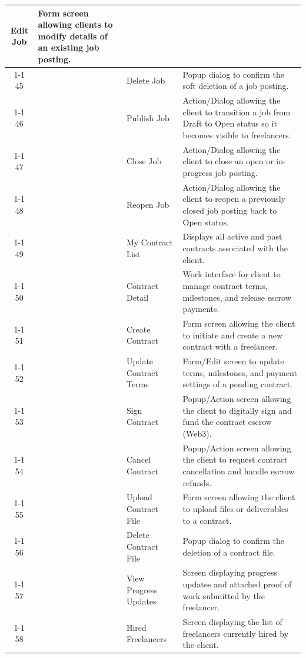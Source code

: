 \begin{longtable}{|c|>{\centering\arraybackslash}m{2.5cm}|p{3.5cm}|p{6cm}|}
Edit Job &
Form screen allowing clients to modify details of an existing job posting.
\\ \cline{1-1}\cline{3-4}
45 &
&
Delete Job &
Popup dialog to confirm the soft deletion of a job posting.
\\ \cline{1-1}\cline{3-4}
46 &
&
Publish Job &
Action/Dialog allowing the client to transition a job from Draft to Open status so it becomes visible to freelancers.
\\ \cline{1-1}\cline{3-4}
47 &
&
Close Job &
Action/Dialog allowing the client to close an open or in-progress job posting.
\\ \cline{1-1}\cline{3-4}
48 &
&
Reopen Job &
Action/Dialog allowing the client to reopen a previously closed job posting back to Open status.
\\ \cline{1-1}\cline{3-4}
49 &
&
My Contract List &
Displays all active and past contracts associated with the client.
\\ \cline{1-1}\cline{3-4}
50 &
&
Contract Detail &
Work interface for client to manage contract terms, milestones, and release escrow payments.
\\ \cline{1-1}\cline{3-4}
51 &
&
Create Contract &
Form screen allowing the client to initiate and create a new contract with a freelancer.
\\ \cline{1-1}\cline{3-4}
52 &
&
Update Contract Terms &
Form/Edit screen to update terms, milestones, and payment settings of a pending contract.
\\ \cline{1-1}\cline{3-4}
53 &
&
Sign Contract &
Popup/Action screen allowing the client to digitally sign and fund the contract escrow (Web3).
\\ \cline{1-1}\cline{3-4}
54 &
&
Cancel Contract &
Popup/Action screen allowing the client to request contract cancellation and handle escrow refunds.
\\ \cline{1-1}\cline{3-4}
55 &
&
Upload Contract File &
Form screen allowing the client to upload files or deliverables to a contract.
\\ \cline{1-1}\cline{3-4}
56 &
&
Delete Contract File &
Popup dialog to confirm the deletion of a contract file.
\\ \cline{1-1}\cline{3-4}
57 &
&
View Progress Updates &
Screen displaying progress updates and attached proof of work submitted by the freelancer.
\\ \cline{1-1}\cline{3-4}
58 &
&
Hired Freelancers &
Screen displaying the list of freelancers currently hired by the client.
\\ \hline

\end{longtable}
